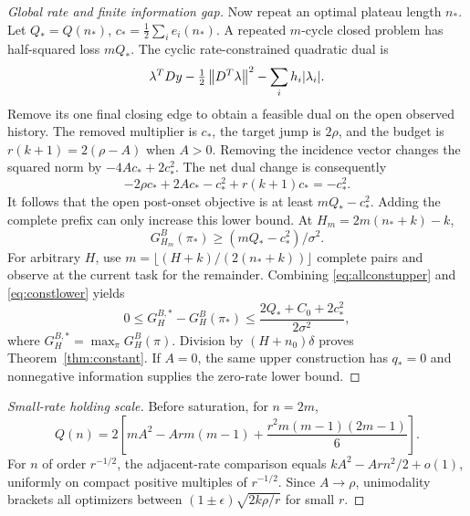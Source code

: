 \begin{proof}[Global rate and finite information gap]
Now repeat an optimal plateau length $n_*$. Let $Q_*=Q(n_*)$, $c_*=\frac12\sum_ie_i(n_*)$. A repeated $m$-cycle closed problem has half-squared loss $mQ_*$. The cyclic rate-constrained quadratic dual is
\begin{equation}
 \lambda^TDy-\tfrac12\left\lVert D^T\lambda\right\rVert^2-\sum_ih_i|\lambda_i|.
\end{equation}
Remove its one final closing edge to obtain a feasible dual on the open observed history. The removed multiplier is $c_*$, the target jump is $2\rho$, and the budget is $r(k+1)=2(\rho-A)$ when $A>0$. Removing the incidence vector changes the squared norm by $-4Ac_*+2c_*^2$. The net dual change is consequently
\begin{equation}
 -2\rho c_*+2Ac_*-c_*^2+r(k+1)c_*=-c_*^2.
\end{equation}
It follows that the open post-onset objective is at least $mQ_*-c_*^2$. Adding the complete prefix can only increase this lower bound. At $H_m=2m(n_*+k)-k$,
\begin{equation}
 G_{H_m}^B(\pi_*)\ge(mQ_*-c_*^2)/\sigma^2.\label{eq:constlower}
\end{equation}
For arbitrary $H$, use $m=\lfloor(H+k)/(2(n_*+k))\rfloor$ complete pairs and observe at the current task for the remainder. Combining \eqref{eq:allconstupper} and \eqref{eq:constlower} yields
\begin{equation}
0\le G_H^{B,*}-G_H^B(\pi_*)\le
\frac{2Q_*+C_0+2c_*^2}{2\sigma^2},
\end{equation}
where $G_H^{B,*}=\max_\pi G_H^B(\pi)$. Division by $(H+n_0)\delta$ proves Theorem~\ref{thm:constant}. If $A=0$, the same upper construction has $q_*=0$ and nonnegative information supplies the zero-rate lower bound.
\end{proof}

\begin{proof}[Small-rate holding scale]
Before saturation, for $n=2m$,
\begin{equation}
 Q(n)=2\left[mA^2-Ar m(m-1)
 +\frac{r^2m(m-1)(2m-1)}6\right].
\end{equation}
For $n$ of order $r^{-1/2}$, the adjacent-rate comparison equals
$kA^2-Arn^2/2+o(1)$, uniformly on compact positive multiples of $r^{-1/2}$. Since $A\to\rho$, unimodality brackets all optimizers between $(1\pm\epsilon)\sqrt{2k\rho/r}$ for small $r$.\end{proof}
